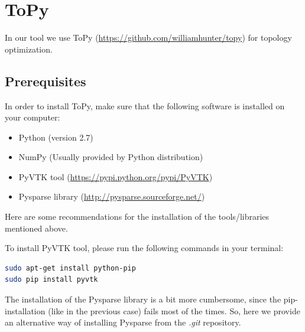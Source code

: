 \documentclass[11pt,a4paper,article,bibtotoc,idxtotoc,headsepline,footsepline,footexclude,DIV13,oneside]{scrbook}
\begin{document}
	\frontmatter
	
	
	
	
	
	
	
	
	\tableofcontents

	\mainmatter
	

	\chapter{ToPy}
	\label{Topy}
	In our tool we use ToPy (\href{https://github.com/williamhunter/topy}{https://github.com/williamhunter/topy}) for topology optimization. 
	\section{Prerequisites}
	\label{ToPy:sec1}
	In order to install ToPy, make sure that the following software is installed on your computer:
	\begin{itemize}
	\item Python (version 2.7)
	\item NumPy (Usually provided by Python distribution)
	\item PyVTK tool (\href{https://pypi.python.org/pypi/PyVTK}{https://pypi.python.org/pypi/PyVTK}) 
	\item Pysparse library (\href{http://pysparse.sourceforge.net/}{http://pysparse.sourceforge.net/})
	\end{itemize}
	Here are some recommendations for the installation of the tools/libraries mentioned above.
	
	To install PyVTK tool, please run the following commands in your terminal:
\begin{lstlisting}[language=bash]
sudo apt-get install python-pip
sudo pip install pyvtk
\end{lstlisting}	
	
	
	The installation of the Pysparse library is a bit more cumbersome, since the pip-installation (like in the previous case) fails most of the times. So, here we provide an alternative way of installing Pysparse from the \textit{.git} repository.
	
\end{document}
